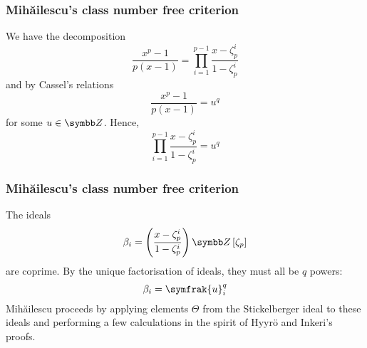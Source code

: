\begin{frame}
\frametitle{Mihăilescu's class number free criterion}

We have the decomposition
\[
    \frac{x^p - 1}{p (x - 1)} = \prod_{i = 1}^{p - 1} \frac{x - \zeta_p^i}{1 - \zeta_p^i}
\]
and by Cassel's relations
\[
    \frac{x^p - 1}{p (x - 1)} = u^q
\]
for some \(u \in \integers\). Hence,
\[
    \prod_{i = 1}^{p - 1} \frac{x - \zeta_p^i}{1 - \zeta_p^i} = u^q
\]
\end{frame}

\begin{frame}
\frametitle{Mihăilescu's class number free criterion}

The ideals
\[
    \beta_i = \left(\frac{x - \zeta_p^i}{1 - \zeta_p^i}\right) \integers\left[\zeta_p\right]
\]
are coprime. By the unique factorisation of ideals, they must all be \(q\) powers:
\[
    \beta_i = \symfrak{u}_i^q
\]
Mihăilescu proceeds by applying elements \(\Theta\) from the Stickelberger ideal to these ideals and performing a few calculations in the spirit of Hyyrö and Inkeri's proofs.
\end{frame}
